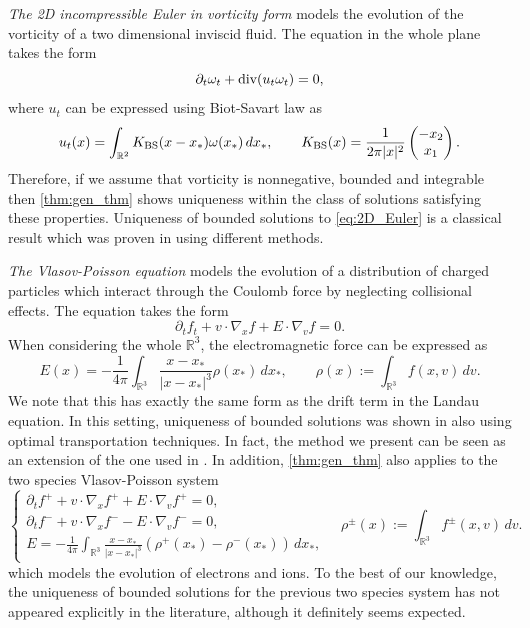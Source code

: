 \documentclass[10pt,oneside]{amsart}
\numberwithin{equation}{section}
\numberwithin{definition}{section}
\numberwithin{theorem}{section}
\numberwithin{lemma}{section}
\begin{document}
\textit{The 2D incompressible Euler in vorticity form} models the evolution of the vorticity of a two dimensional inviscid fluid. The equation in the whole plane takes the form
%
\begin{equation}\label{eq:2D_Euler}
  \partial_{t}\omega_{t}+\textnormal{div}(u_{t}\omega_{t})=0,
\end{equation}
%
where $u_t$ can be expressed using Biot-Savart law as
%
\begin{equation*}
    u_{t}(x)=\int_{\mathbb R^2} K_{\textnormal{BS}}(x-x_{*})\omega(x_{*})\,dx_{*},\qquad 
    K_{\textnormal{BS}}(x)=\frac{1}{2\pi|x|^{2}}\begin{pmatrix}-x_{2}\\x_{1}\end{pmatrix}.
\end{equation*}
%
Therefore, if we assume that vorticity is nonnegative, bounded and integrable then \cref{thm:gen_thm} shows uniqueness within the class of solutions satisfying these properties. Uniqueness of bounded solutions to \cref{eq:2D_Euler} is a classical result which was proven in \cite{Yudovich1963Uniqueness} using different methods.

\textit{The Vlasov-Poisson equation} models the evolution of a distribution of charged particles which interact through the Coulomb force by neglecting collisional effects. The equation takes the form
%
\begin{equation*}
  \partial_{t}f_{t}+v\cdot\nabla_{x}f+E\cdot\nabla_{v}f=0.
\end{equation*}
%
When considering the whole $\mathbb R^3$, the electromagnetic force can be expressed as
%
\begin{equation*}
  E(x)=-\frac{1}{4\pi}\int_{\mathbb R^3}\frac{x-x_{*}}{|x-x_{*}|^{3}}\rho(x_{*})\,dx_{*},\qquad
  \rho(x) := \int_{\mathbb R^3}f(x,v)\,dv.
\end{equation*}
%
We note that this has exactly the same form as the drift term in the Landau equation. In this setting, uniqueness of bounded solutions was shown in \cite{Loeper2006UniquenessVlasovPoisson} also using optimal transportation techniques. In fact, the method we present can be seen as an extension of the one used in \cite{Loeper2006UniquenessVlasovPoisson}. In addition, \cref{thm:gen_thm} also applies to the two species Vlasov-Poisson system
%
\begin{equation*}
  \begin{cases}
    \partial_{t}f^{+}+v\cdot\nabla_{x}f^{+}+E\cdot\nabla_{v}f^{+}=0,\\
    \partial_{t}f^{-}+v\cdot\nabla_{x}f^{-}-E\cdot\nabla_{v}f^{-}=0,\\
    E=\displaystyle{-\frac{1}{4\pi}\int_{\mathbb R^3}\frac{x-x_{*}}{|x-x_{*}|^{3}}\left(\rho^{+}(x_{*})-\rho^{-}(x_{*})\right)\,dx_{*}},
  \end{cases}\quad 
  \rho^{\pm}(x):=\int_{\mathbb R^3} f^{\pm}(x,v)\,dv.
\end{equation*}
%
which models the evolution of electrons and ions. To the best of our knowledge, the uniqueness of bounded solutions for the previous two species system has not appeared explicitly in the literature, although it definitely seems expected.
\end{document}
